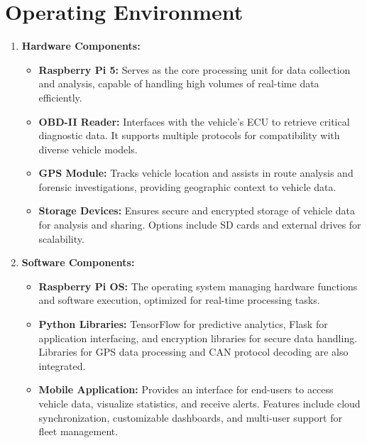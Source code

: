\section{Operating Environment}
\begin{enumerate}
    \item \textbf{Hardware Components:}
    \begin{itemize}
        \item \textbf{Raspberry Pi 5:} Serves as the core processing unit for data collection and analysis, capable of handling high volumes of real-time data efficiently.
        \item \textbf{OBD-II Reader:} Interfaces with the vehicle’s ECU to retrieve critical diagnostic data. It supports multiple protocols for compatibility with diverse vehicle models.
        \item \textbf{GPS Module:} Tracks vehicle location and assists in route analysis and forensic investigations, providing geographic context to vehicle data.
        \item \textbf{Storage Devices:} Ensures secure and encrypted storage of vehicle data for analysis and sharing. Options include SD cards and external drives for scalability.
    \end{itemize}

    \item \textbf{Software Components:}
    \begin{itemize}
        \item \textbf{Raspberry Pi OS:} The operating system managing hardware functions and software execution, optimized for real-time processing tasks.
        \item \textbf{Python Libraries:} TensorFlow for predictive analytics, Flask for application interfacing, and encryption libraries for secure data handling. Libraries for GPS data processing and CAN protocol decoding are also integrated.
        \item \textbf{Mobile Application: } Provides an interface for end-users to access vehicle data, visualize statistics, and receive alerts. Features include cloud synchronization, customizable dashboards, and multi-user support for fleet management.
    \end{itemize}
\end{enumerate}
